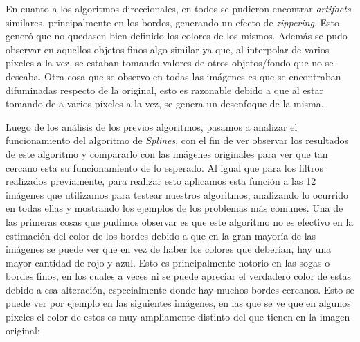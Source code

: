 \documentclass[10pt, a4paper]{article}
\begin{document}
En cuanto a los algoritmos direccionales, en todos se pudieron encontrar \textit{artifacts} similares, principalmente en los bordes, generando un efecto de \textit{zippering}. Esto gener\'o que no quedasen bien definido los colores de los mismos. Adem\'as se pudo observar en aquellos objetos finos algo similar ya que, al interpolar de varios p\'ixeles a la vez, se estaban tomando valores de otros objetos/fondo que no se deseaba. Otra cosa que se observo en todas las im\'agenes es que se encontraban difuminadas respecto de la original, esto es razonable debido a que al estar tomando de a varios p\'ixeles a la vez, se genera un desenfoque de la misma.  

Luego de los an\'alisis de los previos algoritmos, pasamos a analizar el funcionamiento del algoritmo de \textit{Splines}, con el fin de ver observar los resultados de este algoritmo y compararlo con las im\'agenes originales para ver que tan cercano esta su funcionamiento de lo esperado. Al igual que para los filtros realizados previamente, para realizar esto aplicamos esta funci\'on a las 12 im\'agenes que utilizamos para testear nuestros algoritmos, analizando lo ocurrido en todas ellas y mostrando los ejemplos de los problemas m\'as comunes.
Una de las primeras cosas que pudimos observar es que este algoritmo no es efectivo en la estimaci\'on del color de los bordes debido a que en la gran mayor\'ia de las im\'agenes se puede ver que en vez de haber los colores que deber\'ian, hay una mayor cantidad de rojo y azul. Esto es principalmente notorio en las sogas o bordes finos, en los cuales a veces ni se puede apreciar el verdadero color de estas debido a esa alteraci\'on, especialmente donde hay muchos bordes cercanos. Esto se puede ver por ejemplo en las siguientes im\'agenes, en las que se ve que en algunos pixeles el color de estos es muy ampliamente distinto del que tienen en la imagen original:
\end{document}
